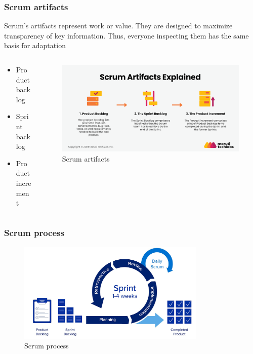 \documentclass[
	11pt, %
]{beamer}
\begin{document}
\begin{frame}
	\frametitle{Scrum artifacts}
	Scrum's artifacts represent work or value. 
	They are designed to maximize transparency
	of key information. Thus, everyone 
	inspecting them has the same basis for 
	adaptation
	\begin{columns}[c] %
		\begin{column}{0.4\textwidth} %
			\begin{itemize} %
				\item Product backlog
				\item Sprint backlog
				\item Product increment
			\end{itemize}
		\end{column}
		\begin{column}{0.7\textwidth} %
			\begin{figure}
				\includegraphics[width=0.8\linewidth]{Scrum_artifact.png}
				\caption{Scrum artifacts}
			\end{figure}
		\end{column}
	\end{columns}
\end{frame}


\begin{frame}
	\frametitle{Scrum process}
	\begin{figure}
	\centering
	\includegraphics[width=0.8\textwidth]{fonc_Scrum.jpg}
	\caption{Scrum process}
	\end{figure}
	
\end{frame}
\end{document}

